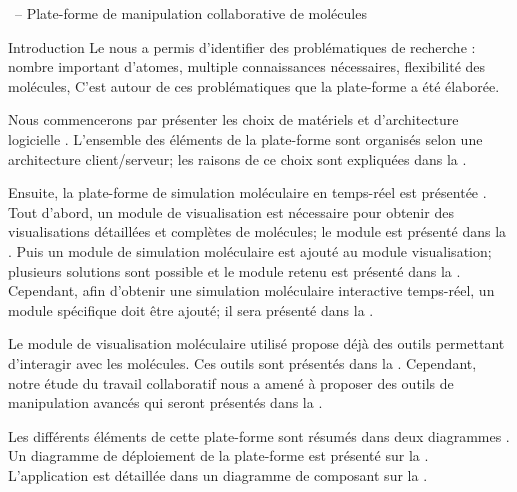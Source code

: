\documentclass[myfrancais,ngerman,english,frenchb]{mythesis}
\begin{document}
	\begin{mychapter}{\myShaddock\ -- Plate-forme de manipulation collaborative de molécules}
		\begin{mysection}{Introduction}
			Le  nous a permis d'identifier des problématiques de recherche : nombre important d'atomes, multiple connaissances nécessaires, flexibilité des molécules, \myetc
			C'est autour de ces problématiques que la plate-forme \myShaddock a été élaborée.

			Nous commencerons par présenter les choix de matériels et d'architecture logicielle .
			L'ensemble des éléments de la plate-forme sont organisés selon une architecture client/serveur; les raisons de ce choix sont expliquées dans la .

			Ensuite, la plate-forme de simulation moléculaire en temps-réel est présentée .
			Tout d'abord, un module de visualisation est nécessaire pour obtenir des visualisations détaillées et complètes de molécules; le module est présenté dans la .
			Puis un module de simulation moléculaire est ajouté au module visualisation; plusieurs solutions sont possible et le module retenu est présenté dans la .
			Cependant, afin d'obtenir une simulation moléculaire interactive temps-réel, un module spécifique doit être ajouté; il sera présenté dans la .

			Le module de visualisation moléculaire utilisé propose déjà des outils permettant d'interagir avec les molécules.
			Ces outils sont présentés dans la .
			Cependant, notre étude du travail collaboratif nous a amené à proposer des outils de manipulation avancés qui seront présentés dans la .

			Les différents éléments de cette plate-forme sont résumés dans deux diagrammes .
			Un diagramme de déploiement  de la plate-forme \myShaddock est présenté sur la .
			L'application  est détaillée dans un diagramme de composant  sur la .


\end{mysection}
\end{mychapter}
\end{document}
